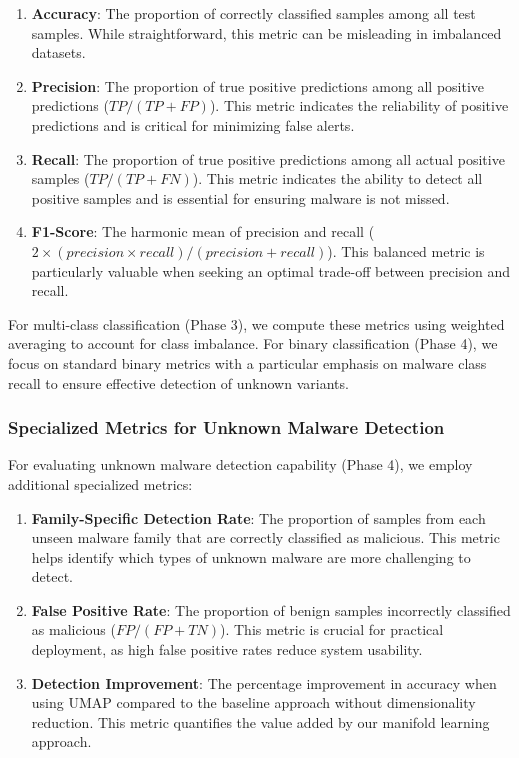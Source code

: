 \begin{enumerate}
    \item \textbf{Accuracy}: The proportion of correctly classified samples among all test samples. While straightforward, this metric can be misleading in imbalanced datasets.
    
    \item \textbf{Precision}: The proportion of true positive predictions among all positive predictions ($TP/(TP+FP)$). This metric indicates the reliability of positive predictions and is critical for minimizing false alerts.
    
    \item \textbf{Recall}: The proportion of true positive predictions among all actual positive samples ($TP/(TP+FN)$). This metric indicates the ability to detect all positive samples and is essential for ensuring malware is not missed.
    
    \item \textbf{F1-Score}: The harmonic mean of precision and recall ($2 \times (precision \times recall) / (precision + recall)$). This balanced metric is particularly valuable when seeking an optimal trade-off between precision and recall.
\end{enumerate}

For multi-class classification (Phase 3), we compute these metrics using weighted averaging to account for class imbalance. For binary classification (Phase 4), we focus on standard binary metrics with a particular emphasis on malware class recall to ensure effective detection of unknown variants.

\subsubsection{Specialized Metrics for Unknown Malware Detection}

For evaluating unknown malware detection capability (Phase 4), we employ additional specialized metrics:

\begin{enumerate}
    \item \textbf{Family-Specific Detection Rate}: The proportion of samples from each unseen malware family that are correctly classified as malicious. This metric helps identify which types of unknown malware are more challenging to detect.
    
    \item \textbf{False Positive Rate}: The proportion of benign samples incorrectly classified as malicious ($FP/(FP+TN)$). This metric is crucial for practical deployment, as high false positive rates reduce system usability.
    
    \item \textbf{Detection Improvement}: The percentage improvement in accuracy when using UMAP compared to the baseline approach without dimensionality reduction. This metric quantifies the value added by our manifold learning approach.
\end{enumerate}

